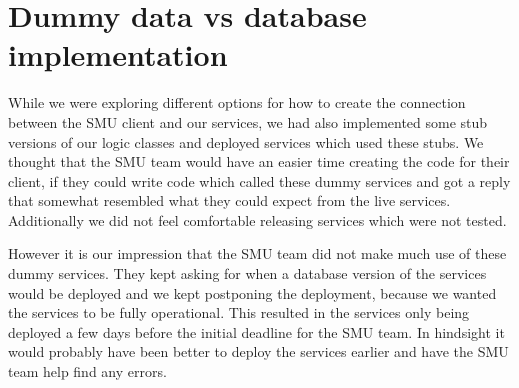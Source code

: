 \documentclass[../report.tex]{subfiles}
\begin{document}
\section{Dummy data vs database implementation}
While we were exploring different options for how to create the connection between the SMU client and our services, we had also implemented some stub versions of our logic classes and deployed services which used these stubs.
We thought that the SMU team would have an easier time creating the code for their client, if they could write code which called these dummy services and got a reply that somewhat resembled what they could expect from the live services.
Additionally we did not feel comfortable releasing services which were not tested.

However it is our impression that the SMU team did not make much use of these dummy services.
They kept asking for when a database version of the services would be deployed and we kept postponing the deployment, because we wanted the services to be fully operational.
This resulted in the services only being deployed a few days before the initial deadline for the SMU team.
In hindsight it would probably have been better to deploy the services earlier and have the SMU team help find any errors.
\end{document}

